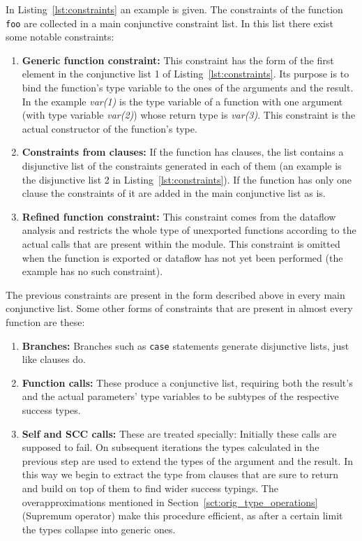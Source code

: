 In Listing~\ref{lst:constraints} an example is given. The constraints
of the function \texttt{foo} are collected in a main conjunctive
constraint list. In this list there exist some notable constraints:

\begin{enumerate}
  \item \textbf{Generic function constraint:} This constraint has the
    form of the first element in the conjunctive list 1 of
    Listing~\ref{lst:constraints}. Its purpose is to bind the
    function's type variable to the ones of the arguments and the
    result. In the example \emph{var(1)} is the type variable of a
    function with one argument (with type variable \emph{var(2)})
    whose return type is \emph{var(3)}. This constraint is the actual
    constructor of the function's type.
  \item \textbf{Constraints from clauses:} If the function has
    clauses, the list contains a disjunctive list of the constraints
    generated in each of them (an example is the disjunctive list 2 in
    Listing~\ref{lst:constraints}). If the function has only one
    clause the constraints of it are added in the main conjunctive
    list as is.
  \item \textbf{Refined function constraint:} This constraint comes
    from the dataflow analysis and restricts the whole type of
    unexported functions according to the actual calls that are
    present within the module. This constraint is omitted when the
    function is exported or dataflow has not yet been performed (the
    example has no such constraint).
\end{enumerate}

The previous constraints are present in the form described above in
every main conjunctive list. Some other forms of constraints that are
present in almost every function are these:

\begin{enumerate}
  \item \textbf{Branches:} Branches such as \texttt{case} statements
    generate disjunctive lists, just like clauses do.
  \item \textbf{Function calls:} These produce a conjunctive list,
    requiring both the result's and the actual parameters' type
    variables to be subtypes of the respective success types.
  \item \textbf{Self and SCC calls:} These are treated specially:
    Initially these calls are supposed to fail. On subsequent
    iterations the types calculated in the previous step are used to
    extend the types of the argument and the result. In this way we
    begin to extract the type from clauses that are sure to return and
    build on top of them to find wider success typings. The
    overapproximations mentioned in
    Section~\ref{sct:orig_type_operations} (Supremum operator) make
    this procedure efficient, as after a certain limit the types
    collapse into generic ones.
\end{enumerate}

